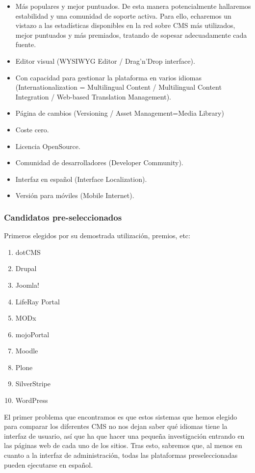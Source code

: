 \begin{itemize}
\item Más populares y mejor puntuados. De esta manera potencialmente hallaremos estabilidad y una comunidad de soporte activa. Para ello, echaremos un vistazo a las estadísticas disponibles en la red sobre CMS más utilizados, mejor puntuados y más premiados, tratando de sopesar adecuadamente cada fuente.
\item Editor visual (WYSIWYG Editor / Drag'n'Drop interface).
\item Con capacidad para gestionar la plataforma en varios idiomas (Internationalization = Multilingual Content / Multilingual Content Integration / Web-based Translation Management).
\item Página de cambios (Versioning / Asset Management=Media Library)
\item Coste cero.
\item Licencia OpenSource.
\item Comunidad de desarrolladores (Developer Community).
\item Interfaz en español (Interface Localization).
\item Versión para móviles (Mobile Internet).
\end{itemize}

\subsubsection{Candidatos pre-seleccionados}
\par Primeros elegidos por su demostrada utilización, premios, etc:

\begin{enumerate}
\item dotCMS
\item Drupal
\item Joomla!
\item LifeRay Portal
\item MODx
\item mojoPortal
\item Moodle
\item Plone
\item SilverStripe
\item WordPress
\end{enumerate}

\par El primer problema que encontramos es que estos sistemas que hemos elegido para comparar los diferentes CMS no nos dejan saber qué idiomas tiene la interfaz de usuario, así que ha que hacer una pequeña investigación entrando en las páginas web de cada uno de los sitios. Tras esto, sabremos que, al menos en cuanto a la interfaz de administración, todas las plataformas preseleccionadas pueden ejecutarse en español.


